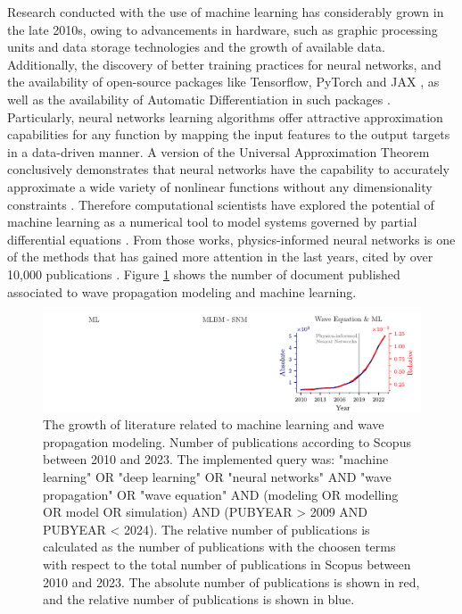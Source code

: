 \documentclass[11pt,twoside]{article}
\begin{document}
Research conducted with the use of machine learning has considerably grown in the late 2010s, owing to advancements 
in hardware, such as graphic processing units and data storage technologies and the growth of available data. 
Additionally, the discovery of better training practices for neural networks, and the availability of open-source 
packages like Tensorflow, PyTorch and JAX \citep{abadi_tensorflow_2016,paszke_pytorch_2019,jax2018github}, as well 
as the availability of Automatic Differentiation in such packages \citep{paszke_automatic_2017,baydin_automatic_2017}. 
Particularly, neural networks learning algorithms offer attractive approximation capabilities for any function by 
mapping the input features to the output targets in a data-driven manner. A version of the Universal Approximation 
Theorem conclusively demonstrates that neural networks have the capability to accurately approximate a wide 
variety of nonlinear functions without any dimensionality constraints \citep{barron_universal_1993}. Therefore 
computational scientists have explored the potential of machine learning as a numerical tool to model systems governed 
by partial differential equations \citep{cuomo_scientific_2022,karniadakis_physics-informed_2021}. From those
works, physics-informed neural networks is one of the methods that has gained more attention in the last years,
cited by over 10,000 publications \citep{Raissi2019}. Figure \ref{fig:publications_absolute_relative} shows the 
number of document published associated to wave propagation modeling and machine learning. 

\begin{figure}[H]
\centering
    \includegraphics[width=1.0\textwidth]{figs/publications_abs_relat.pdf}
    \caption{The growth of literature related to machine learning and wave propagation modeling. Number of publications 
    according to Scopus between 2010 and 2023. The implemented query was: "machine learning" OR "deep learning" 
    OR "neural networks" AND "wave propagation" OR "wave equation" AND (modeling OR modelling OR model OR simulation) 
    AND (PUBYEAR > 2009 AND PUBYEAR < 2024). The relative number of publications is calculated as the number of
    publications with the choosen terms with respect to the total number of publications in Scopus between 2010 and 2023.
    The absolute number of publications is shown in red, and the relative number of publications is shown in blue.} 
    \label{fig:publications_absolute_relative}
\end{figure}
\end{document}
